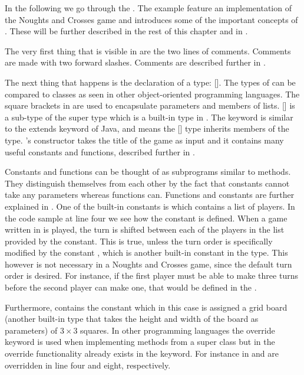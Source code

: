 In the following we go through the . The example feature
an implementation of the Noughts and Crosses game and introduces some of the important concepts of \productname{}. These will be
further described in the rest of this chapter and in .

The very first thing that is visible in  are the
two lines of comments. Comments are made with two forward slashes. Comments are
described further in .

The next thing that happens is the declaration of a type: 
[].  The types of \productname{} can be compared to classes as
seen in other object-oriented programming languages. The square brackets in
\productname{} are used to encapsulate parameters and members
of lists.  [] is a sub-type of the super type 
which is a built-in type in \productname{}. The  keyword is
similar to the extends keyword of Java, and means the [] type
inherits members of the  type.  's constructor takes the
title of the game as input and it contains many useful constants and
functions, described further in . 


Constants and functions can be thought of as subprograms similar to methods.
They distinguish themselves from each other by the fact that constants cannot
take any parameters whereas functions can. Functions and constants are further
explained in . One of the built-in constants is
 which contains a list of players. In the code sample at line
four we see how the constant is defined. When a game written in
\productname{} is played, the turn is shifted between each of the players in
the list provided by the  constant. This is true, unless the turn
order is specifically modified by the constant , which is
another built-in constant in the  type. This however is not necessary
in a Noughts and Crosses game, since the default turn order is desired. For instance,
if the first player must be able to make three turns before the second player
can make one, that would be defined in the .

Furthermore,  contains the constant  which in
this case is assigned a grid board (another built-in type that takes the height
and width of the board as parameters) of $3 \times 3$ squares. In other
programming languages the override keyword is used when implementing methods
from a super class but in \productname{} the override functionality
already exists in the  keyword. For instance in
  and  are
overridden in line four and eight, respectively.

